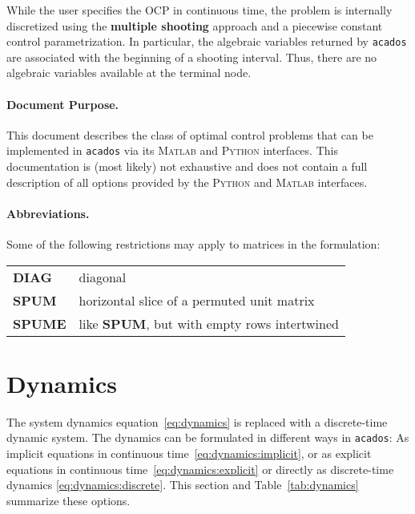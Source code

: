 \documentclass[english]{article}
\newcommand{\code}[1]{\texttt{#1}}
\newcommand{\acados}{\texttt{acados}}
\newcommand{\matlab}{\textsc{Matlab}}
\newcommand{\python}{\textsc{Python}}
\begin{document}
While the user specifies the OCP in continuous time, the problem is internally discretized using the \textbf{multiple shooting} approach and a piecewise constant control parametrization.
In particular, the algebraic variables returned by \acados{} are associated with the beginning of a shooting interval.
Thus, there are no algebraic variables available at the terminal node.

%

%
\paragraph{Document Purpose.}
This document describes the class of optimal control problems that can be implemented in \acados{} via its \matlab{} and \python{} interfaces.
This documentation is (most likely) not exhaustive and does not contain a full description of all options provided by the \python{} and \matlab{} interfaces.


\paragraph{Abbreviations.}
Some of the following restrictions may apply to matrices in the formulation:
\begin{center}
	\begin{tabular}{ll}
		\textbf{DIAG} & diagonal\\
		\textbf{SPUM} & horizontal slice of a permuted unit matrix\\
		\textbf{SPUME} & like \textbf{SPUM}, but with empty rows intertwined
	\end{tabular}
\end{center}


\section{Dynamics}\label{sec:dynamics}
%
%
The system dynamics equation~\eqref{eq:dynamics} is replaced with a discrete-time dynamic system.
The dynamics can be formulated in different ways in \acados:
As implicit equations in continuous time~\eqref{eq:dynamics:implicit}, or as explicit equations in continuous time~\eqref{eq:dynamics:explicit} or directly as discrete-time dynamics \eqref{eq:dynamics:discrete}.
This section and Table~\ref{tab:dynamics} summarize these options.
%
\end{document}
